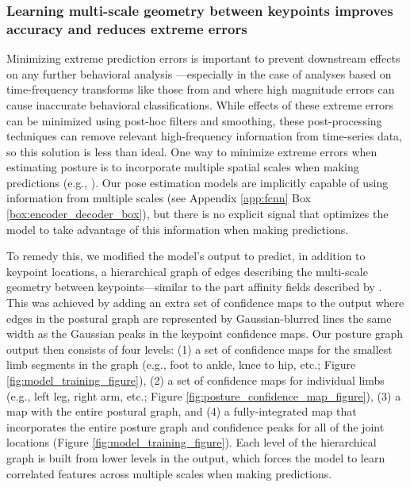 \documentclass[11pt,a4paper,oneside]{article}
\begin{document}
\subsubsection[Learning multi-scale geometry between keypoints improves accuracy]{Learning multi-scale geometry between keypoints improves accuracy and reduces extreme errors}

Minimizing extreme prediction errors is important to prevent downstream effects on any further behavioral analysis \citep{seethapathi2019movement}---especially in the case of analyses based on time-frequency transforms like those from \cite{berman2014mapping, berman2016predictability, klibaite2017unsupervised, todd2017systematic, klibaite2019interacting} and \cite{pereira2019fast} where high magnitude errors can cause inaccurate behavioral classifications. While effects of these extreme errors can be minimized using post-hoc filters and smoothing, these post-processing techniques can remove relevant high-frequency information from time-series data, so this solution is less than ideal. One way to minimize extreme errors when estimating posture is to incorporate multiple spatial scales when making predictions (e.g., \citealt{chen2017adversarial}). Our pose estimation models are implicitly capable of using information from multiple scales (see Appendix \ref{app:fcnn} Box \ref{box:encoder_decoder_box}), but there is no explicit signal that optimizes the model to take advantage of this information when making predictions.

To remedy this, we modified the model's output to predict, in addition to keypoint locations, a hierarchical graph of edges describing the multi-scale geometry between keypoints—similar to the part affinity fields described by \cite{cao2017realtime}. This was achieved by adding an extra set of confidence maps to the output where edges in the postural graph are represented by Gaussian-blurred lines the same width as the Gaussian peaks in the keypoint confidence maps. Our posture graph output then consists of four levels: (1) a set of confidence maps for the smallest limb segments in the graph (e.g., foot to ankle, knee to hip, etc.; Figure \ref{fig:model_training_figure}), (2) a set of confidence maps for individual limbs (e.g., left leg, right arm, etc.; Figure \ref{fig:posture_confidence_map_figure}), (3) a map with the entire postural graph, and (4) a fully-integrated map that incorporates the entire posture graph and confidence peaks for all of the joint locations (Figure \ref{fig:model_training_figure}). Each level of the hierarchical graph is built from lower levels in the output, which forces the model to learn correlated features across multiple scales when making predictions.
\end{document}
